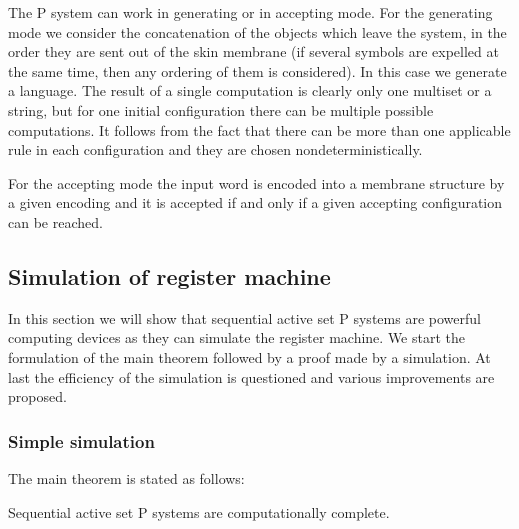 
  The P system can work in generating or in accepting mode. For the generating mode we consider the concatenation of the objects which leave the system, in the order they are sent out of the skin membrane (if several symbols are expelled at the same time, then any ordering of them is considered). In this case we generate a language. The result of a single computation is clearly only one multiset or a string, but for one initial configuration there can be multiple possible computations. It follows from the fact that there can be more than one applicable rule in each configuration and they are chosen nondeterministically.

  For the accepting mode the input word is encoded into a membrane structure by a given encoding and it is accepted if and only if a given accepting configuration can be reached\cite{Ibarra05Active}.


\subsection{Simulation of register machine} %
\label{sub:simulation_of_register_machine}
  In this section we will show that sequential active set P systems are powerful computing devices as they can simulate the register machine. We start the formulation of the main theorem followed by a proof made by a simulation. At last the efficiency of the simulation is questioned and various improvements are proposed.

  \subsubsection{Simple simulation} %
  \label{ssub:simple_simulation}
    
    The main theorem is stated as follows:

    \begin{veta}
      Sequential active set P systems are computationally complete.
    \end{veta}

